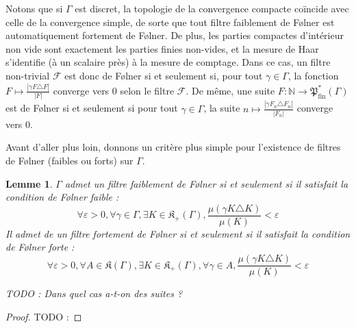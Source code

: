 \documentclass[a4paper,12pt]{article}
\newtheorem{lemma}[theorem]{Lemme}
\newcommand{\R}{\mathbb{R}}
\newcommand{\N}{\mathbb{N}}
\newcommand{\abs}[1]{\left\vert#1\right\vert}
\newcommand{\card}[1]{\abs{#1}}
\newcommand{\ssi}{si et seulement si }
\newcommand{\finparts}{\mathfrak{P}_{\mathrm{fin}}}
\newcommand{\TODO}[1]{{\color{red}TODO :} #1}
\begin{document}
Notons que si $\Gamma$ est discret, 
la topologie de la convergence compacte coïncide avec celle de la convergence simple, de sorte que tout filtre 
faiblement de F\o{}lner est automatiquement fortement de F\o{}lner.
De plus, les parties compactes d'intérieur non vide sont exactement les parties finies non-vides,
et la mesure de Haar s'identifie (à un scalaire près) à la mesure de comptage. Dans ce cas, un filtre non-trivial $\mathscr{F}$
est donc de F\o{}lner si et seulement si, pour tout $\gamma\in\Gamma$, la fonction $F\mapsto \frac{\card{\gamma F\triangle F}}{\card{F}}$ 
converge vers $0$ selon le filtre $\mathscr{F}$. De même, une suite $F:\N\to\finparts^*(\Gamma)$
est de F\o{}lner \ssi pour tout $\gamma\in\Gamma$, la suite $n\mapsto\frac{\card{\gamma F_n\triangle F_n}}{\card{F_n}}$ converge 
vers $0$.

Avant d'aller plus loin, donnons un critère plus simple pour l'existence de filtres de F\o{}lner (faibles ou forts) sur $\Gamma$.

\begin{lemma}\label{Folner_filter_of_cond}
    $\Gamma$ admet un filtre faiblement de F\o{}lner \ssi il satisfait la 
    \emph{condition de F\o{}lner faible} :
    \begin{equation}\label{weak_Folner_cond}\tag{WF}
        \forall\varepsilon>0, \forall \gamma\in\Gamma, \exists K\in\mathfrak{K}_+(\Gamma), 
        \frac{\mu(\gamma K\triangle K)}{\mu(K)}<\varepsilon
    \end{equation}
    Il admet de un filtre fortement de F\o{}lner \ssi il satisfait la \emph{condition de F\o{}lner forte} : 
    \begin{equation}\label{strong_Folner_cond}\tag{SF}
        \forall\varepsilon>0, \forall A\in\mathfrak{K}(\Gamma), \exists K\in\mathfrak{K}_+(\Gamma), \forall\gamma\in A, 
        \frac{\mu(\gamma K\triangle K)}{\mu(K)}<\varepsilon
    \end{equation}

    \TODO{Dans quel cas a-t-on des suites ?}
\end{lemma}

\begin{proof}
    \TODO{}
\end{proof}

\end{document}
